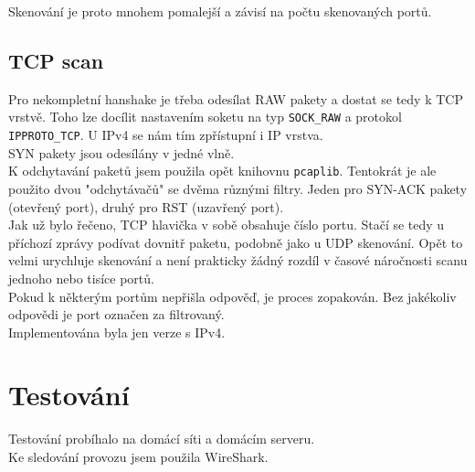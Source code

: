 \documentclass[11pt, a4paper]{article}
\begin{document}
Skenování je proto mnohem pomalejší a závisí na počtu skenovaných portů.\\


\subsection{TCP scan}
Pro nekompletní hanshake je třeba odesílat RAW pakety a dostat se tedy k TCP vrstvě. Toho lze docílit nastavením soketu na typ \texttt{SOCK\_RAW} a protokol \texttt{IPPROTO\_TCP}. U IPv4 se nám tím zpřístupní i IP vrstva.\\

SYN pakety jsou odesílány v jedné vlně.\\

K odchytavání paketů jsem použila opět knihovnu \texttt{pcaplib}. Tentokrát je ale použito dvou   "odchytávačů" se dvěma různými filtry. Jeden pro SYN-ACK pakety (otevřený port), druhý pro RST (uzavřený port).\\

Jak už bylo řečeno, TCP hlavička v sobě obsahuje číslo portu. Stačí se tedy u příchozí zprávy podívat dovnitř paketu, podobně jako u UDP skenování.  Opět to velmi urychluje skenování a není prakticky žádný rozdíl v časové náročnosti scanu jednoho nebo tisíce portů.\\

Pokud k některým portům nepřišla odpověď, je proces zopakován. Bez jakékoliv odpovědi je port označen za filtrovaný.\\

Implementována byla jen verze s IPv4.\\

\section{Testování}
Testování probíhalo na domácí síti a domácím serveru. \\
Ke sledování provozu jsem použila WireShark.



\begin{center}
\onecolumn
\renewcommand{\refname}{Zdroje}

\end{center}
\end{document}
